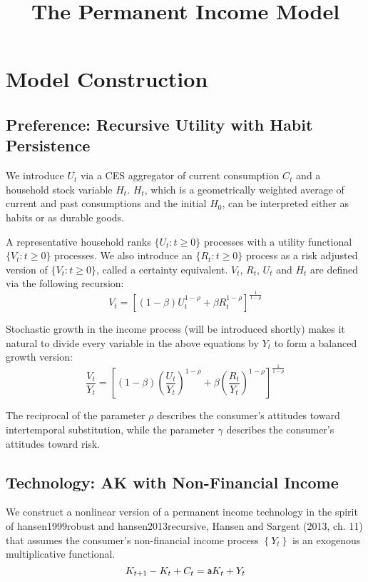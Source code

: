 \documentclass{article}
\title{The Permanent Income Model}
\theoremstyle{exampstyle}
\begin{document}
\maketitle

\section{Model Construction}
\subsection{Preference: Recursive Utility with Habit Persistence}
We introduce $U_t$ via a CES aggregator of current consumption $C_t$ and a household stock variable $H_t$. $H_t$, which is a geometrically weighted average of current and past consumptions and the initial $H_0$, can be interpreted either as habits or as durable goods.

A representative household ranks $\{U_t: t\geq 0\}$ processes with a utility functional $\{V_t: t\geq 0\}$ processes. We also introduce an $\{R_t: t\geq 0\}$ process as a risk adjusted version of  $\{V_t: t\geq 0\}$, called a certainty equivalent. $V_t$, $R_t$, $U_t$ and $H_t$ are defined via the following recursion:
\begin{equation}\label{key}
	   V_t = \left[(1-\beta)U_t^{1-\rho}+\beta R_t^{1-\rho}\right]^{\frac{1}{1-\rho}} 
\end{equation}

Stochastic growth in the income process (will be introduced shortly) makes it natural to divide every variable in the above equations by $Y_t$ to form a balanced growth version: 
\begin{equation}\label{key}
	    \frac{V_t}{Y_t} = \left[(1-\beta)\left(\frac{U_t}{Y_t}\right)^{1-\rho}+\beta\left(\frac{R_t}{Y_t}\right)^{1-\rho}\right]^{\frac{1}{1-\rho}}
\end{equation}

The reciprocal of the parameter $\rho$ describes the consumer's attitudes toward intertemporal substitution, while the parameter $\gamma$ describes the consumer's attitudes toward risk.

\subsection{Technology: AK with Non-Financial Income}

We construct a nonlinear version of a permanent income technology in the spirit of hansen1999robust and hansen2013recursive, Hansen and Sargent (2013, ch. 11) that assumes the consumer's non-financial income process $\left\{Y_t\right\}$ is an exogenous multiplicative functional.
\begin{equation}\label{key}
	    K_{t+1} - K_t +C_t = {\sf a} K_t + Y_t
\end{equation}
\end{document}
